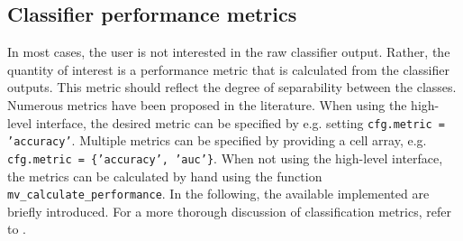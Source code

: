 \documentclass[utf8]{frontiersSCNS} %
\newcommand{\ttt}[1]{\texttt{#1}}
\begin{document}
\subsection{Classifier performance metrics}\label{sec:metrics}

In most cases, the user is not interested in the raw classifier output. Rather, the quantity of interest is a performance metric that is calculated from the classifier outputs.
This metric should reflect the degree of separability between the classes. Numerous metrics have been proposed in the literature.  When using the high-level interface, the desired metric can be specified by e.g. setting \ttt{cfg.metric = 'accuracy'}. Multiple metrics can be specified by providing a cell array, e.g. \ttt{cfg.metric = \{'accuracy', 'auc'\}}. When not using the high-level interface, the metrics can be calculated by hand using the function \ttt{mv\_calculate\_performance}. In the following, the available implemented are briefly introduced. For a more thorough discussion of classification metrics, refer to  \cite{Sokolova2009ATasks}.
\end{document}
